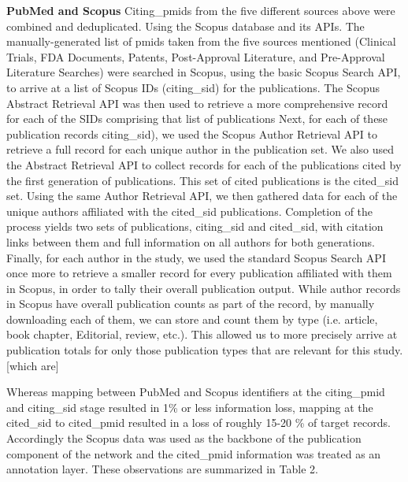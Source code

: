 \documentclass[10pt,letterpaper]{article}
\begin{document}
\textbf{PubMed and Scopus} Citing\_pmids from the five different sources above  were combined and deduplicated. Using the Scopus database and its APIs. The manually-generated list of pmids taken from the five sources mentioned (Clinical Trials, FDA Documents, Patents, Post-Approval Literature, and Pre-Approval Literature Searches) were searched in Scopus, using the basic Scopus Search API, to arrive at a list of Scopus IDs (citing\_sid) for the publications. The Scopus Abstract Retrieval API was then used to retrieve a more comprehensive record for each of the SIDs comprising that list of publications Next, for each of these publication records citing\_sid), we used the Scopus Author Retrieval API to retrieve a full record for each unique author in the  publication set. We also used the Abstract Retrieval API to collect records for each of the publications cited by the first generation of publications. This set of cited publications is the cited\_sid set.  Using the same Author Retrieval API, we then gathered data for each of the unique authors affiliated with the cited\_sid publications. Completion of the process yields two sets of publications, citing\_sid and cited\_sid, with citation links between them and full information on all authors for both generations. Finally, for each author in the study, we used the standard Scopus Search API once more to retrieve a smaller record for every publication affiliated with them in Scopus, in order to tally their overall publication output. While author records in Scopus have overall publication counts as part of the record, by manually downloading each of them, we can store and count them by type (i.e. article, book chapter, Editorial, review, etc.). This allowed us to more precisely arrive at publication totals for only those publication types that are relevant for this study. [which are]

Whereas mapping between PubMed and Scopus identifiers at the citing\_pmid and citing\_sid stage resulted in 1\% or less information loss, mapping at the cited\_sid to cited\_pmid resulted in a loss of roughly 15-20 \% of target records. Accordingly the Scopus data  was used as the backbone of the publication component of the network and the cited\_pmid information was treated as an annotation layer.  These observations are summarized in Table 2. 
\end{document}
